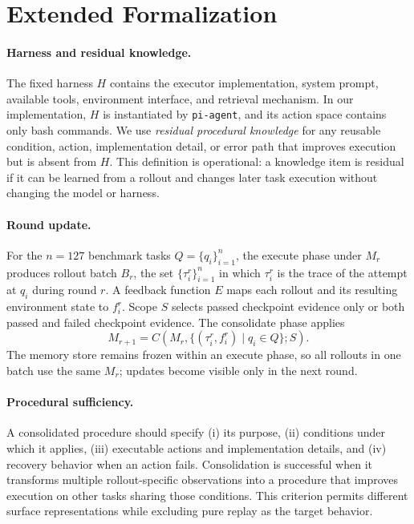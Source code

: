 \section{Extended Formalization}
\label{app:formalization}

\paragraph{Harness and residual knowledge.}
The fixed harness $H$ contains the executor implementation, system prompt,
available tools, environment interface, and retrieval mechanism. In our
implementation, $H$ is instantiated by \texttt{pi-agent}, and its action space
contains only bash commands. We use \emph{residual procedural knowledge} for
any reusable condition, action, implementation detail, or error path that
improves execution but is absent from $H$. This definition is operational: a
knowledge item is residual if it can be learned from a rollout and changes
later task execution without changing the model or harness.

\paragraph{Round update.}
For the $n=127$ benchmark tasks $Q=\{q_i\}_{i=1}^{n}$, the execute phase under $M_r$
produces rollout batch $B_r$, the set $\{\tau_i^r\}_{i=1}^{n}$ in which
$\tau_i^r$ is the trace of the attempt at $q_i$ during round $r$. A feedback function $E$ maps each rollout and its
resulting environment state to $f_i^r$. Scope $S$ selects passed checkpoint
evidence only or both passed and failed checkpoint evidence. The consolidate
phase applies
\[
M_{r+1}=C\!\left(M_r,
  \{(\tau_i^r,f_i^r)\mid q_i\in Q\};S\right).
\]
The memory store remains frozen within an execute phase, so all rollouts in one
batch use the same $M_r$; updates become visible only in the next round.

\paragraph{Procedural sufficiency.}
A consolidated procedure should specify (i) its purpose, (ii) conditions under
which it applies, (iii) executable actions and implementation details, and
(iv) recovery behavior when an action fails. Consolidation is successful when
it transforms multiple rollout-specific observations into a procedure that
improves execution on other tasks sharing those conditions. This criterion
permits different surface representations while excluding pure replay as the
target behavior.

